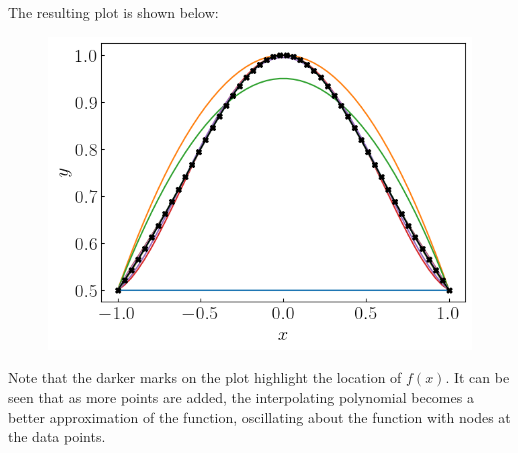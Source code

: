 \documentclass[12pt,a4paper]{article}
\begin{document}

The resulting plot is shown below:
\begin{figure}[H]
    \begin{center}
        \includegraphics[scale=0.75]{./fig1.png}
    \end{center} 
\end{figure}

Note that the darker marks on the plot highlight the location of $f(x)$.
It can be seen that as more points are added, the interpolating polynomial becomes a better approximation of the function, oscillating about the function with nodes at the data points.
\end{document}
